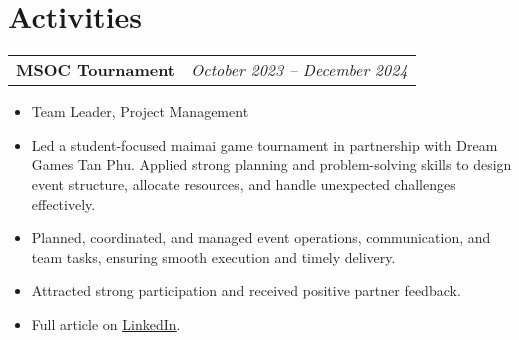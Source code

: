 \documentclass[a4paper,11pt]{article}
\begin{document}
\section{Activities}
\begin{spacing}{1.05}
\begin{tabularx}{\linewidth}{@{}l r@{}}
  \textbf{MSOC Tournament} & \hspace*{0.54\linewidth}\normalsize\textit{October 2023 -- December 2024} \\
\end{tabularx}
\begin{itemize}[nosep,leftmargin=1.2em,itemsep=2pt]
  \item Team Leader, Project Management
  \item Led a student-focused maimai game tournament in partnership with Dream Games Tan Phu. Applied strong planning and problem-solving skills to design event structure, allocate resources, and handle unexpected challenges effectively.
  \item Planned, coordinated, and managed event operations, communication, and team tasks, ensuring smooth execution and timely delivery.
  \item Attracted strong participation and received positive partner feedback.
  \item Full article on \href{https://www.linkedin.com/feed/update/urn:li:activity:7300042302784233472/}{\underline{LinkedIn}}.
\end{itemize}
\end{spacing}




\vspace*{\fill}
\end{document}
